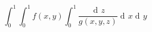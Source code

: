 \documentclass[nofonts]{ctexart}
\DeclareMathOperator \dif{d \!}
\begin{document}
\[
	\int_0^1 \int_0^1 f(x,y) \int_0^1 \frac{\dif z}{g(x,y,z)}
	\dif x \dif y
\]
\end{document}
